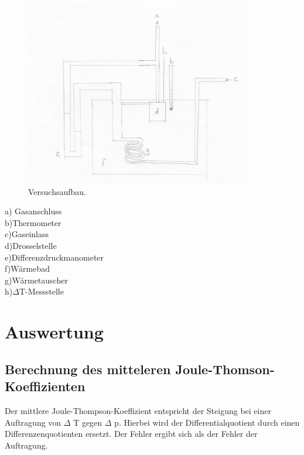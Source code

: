 \documentclass[12pt,a4paper,titlepage,headinclude,bibtotoc]{scrartcl}
\begin{document}
\begin{figure} [h!]
\begin{center}
\includegraphics[scale=1.5]{VersuchsaufbauJT.png} \end{center}
\caption{Versuchsaufbau.}
\end{figure}

a) Gasanschluss\\
b)Thermometer\\
c)Gaseinlass\\
d)Drosselstelle\\
e)Differenzdruckmanometer\\
f)Wärmebad\\
g)Wärmetauscher\\
h)$\Delta$T-Messstelle\\

 
 


\section{Auswertung}



\subsection{Berechnung des mitteleren Joule-Thomson-Koeffizienten}
Der mittlere Joule-Thompson-Koeffizient entspricht der Steigung bei einer Auftragung von $\Delta$ T gegen $\Delta$ p. Hierbei wird der Differentialquotient durch einen Differenzenquotienten ersetzt. Der Fehler ergibt sich als der Fehler der Auftragung.\\
\end{document}
